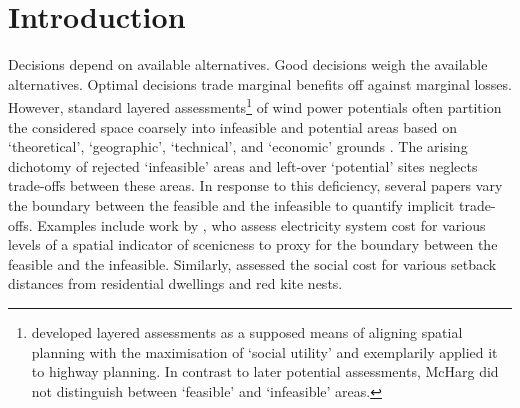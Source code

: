 \documentclass[review, a4paper, 12pt, authoryear, times]{elsarticle}
\begin{document}
\section{Introduction} \label{sec:intro}
Decisions depend on available alternatives.
Good decisions weigh the available alternatives.
Optimal decisions trade marginal benefits off against marginal losses.
However, standard layered assessments\footnote{\cite{McHarg1969} developed layered assessments as a supposed means of aligning spatial planning with the maximisation of `social utility' and exemplarily applied it to highway planning. In contrast to later potential assessments, McHarg did not distinguish between `feasible' and `infeasible' areas.} of wind power potentials often partition the considered space coarsely into infeasible and potential areas based on `theoretical', `geographic', `technical', and `economic' grounds \citep{McKenna2022}.
The arising dichotomy of rejected `infeasible' areas and left-over `potential' sites neglects trade-offs between these areas.
In response to this deficiency, several papers vary the boundary between the feasible and the infeasible to quantify implicit trade-offs. 
Examples include work by \cite{McKenna2021}, who assess electricity system cost for various levels of a spatial indicator of scenicness to proxy for the boundary between the feasible and the infeasible.
Similarly, \cite{Reutter2023} assessed the social cost for various setback distances from residential dwellings and red kite nests.
\end{document}

